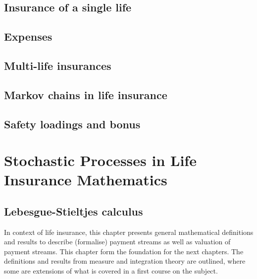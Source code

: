 \documentclass[a4paper,12pt,openany]{book}
\begin{document}
\hypertarget{insurance-of-a-single-life}{%
\section{Insurance of a single life}\label{insurance-of-a-single-life}}

\hypertarget{expenses}{%
\section{Expenses}\label{expenses}}

\hypertarget{multi-life-insurances}{%
\section{Multi-life insurances}\label{multi-life-insurances}}

\hypertarget{markov-chains-in-life-insurance}{%
\section{Markov chains in life insurance}\label{markov-chains-in-life-insurance}}

\hypertarget{safety-loadings-and-bonus}{%
\section{Safety loadings and bonus}\label{safety-loadings-and-bonus}}

\hypertarget{stochastic-processes-in-life-insurance-mathematics}{%
\chapter{Stochastic Processes in Life Insurance Mathematics}\label{stochastic-processes-in-life-insurance-mathematics}}

\hypertarget{lebesgue-stieltjes-calculus}{%
\section{Lebesgue-Stieltjes calculus}\label{lebesgue-stieltjes-calculus}}

In context of life insurance, this chapter presents general mathematical definitions and results to describe (formalise) payment streams as well as valuation of payment streams. This chapter form the foundation for the next chapters. The definitions and results from measure and integration theory are outlined, where some are extensions of what is covered in a first course on the subject.
\end{document}
